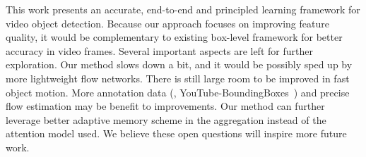 \documentclass[10pt,twocolumn,letterpaper]{article}
\begin{document}
This work presents an accurate, end-to-end and principled learning framework for video object detection. Because our approach focuses on improving feature quality, it would be complementary to existing box-level framework for better accuracy in video frames. Several important aspects are left for further exploration. Our method slows down a bit, and it would be possibly sped up by more lightweight flow networks. There is still large room to be improved in fast object motion. More annotation data (\eg, YouTube-BoundingBoxes~\cite{Esteban2017youtube}) and precise flow estimation may be benefit to improvements. Our method can further leverage better adaptive memory scheme in the aggregation instead of the attention model used. We believe these open questions will inspire more future work. 


{\small


}
\end{document}
